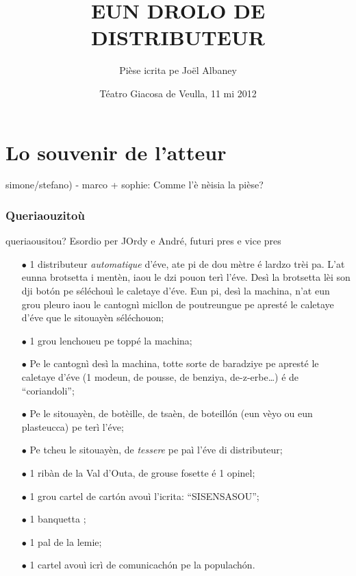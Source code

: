 \title{EUN DROLO DE DISTRIBUTEUR}
\author{Pièse icrita pe Joël Albaney}
\date{Téatro Giacosa de Veulla, 11 mi 2012}

\maketitle



\chapter*{Lo souvenir de l'atteur}
simone/stefano) - marco + sophie: Comme l'è nèisia la pièse? 

\subsection*{Queriaouzitoù}
queriaousitou? Esordio per JOrdy e André, futuri pres e vice pres

\Scenographie
\begin{itemize}
\item[$\bullet$] 1 distributeur \textit{automatique} d'éve, ate pi de dou mètre é lardzo trèi pa. L'at eunna brotsetta i mentèn, iaou le dzi pouon terì l'éve. Desì la brotsetta lèi son dji bot\'on pe séléchouì le caletaye d'éve. Eun pi, desì la machina, n'at eun grou pleuro iaou le cantognì micllon de poutreungue pe apresté le caletaye d'éve que le sitouayèn séléchouon;
\item[$\bullet$] 1 grou lenchoueu pe toppé la machina;
\item[$\bullet$] Pe le cantognì desì la machina, totte sorte de baradziye pe apresté le caletaye d'éve (1 modeun, de pousse, de benziya, de-z-erbe\ldots ) é de ``coriandoli'';
\item[$\bullet$] Pe le sitouayèn, de botèille, de tsaèn, de boteill\'on (eun vèyo ou eun plasteucca) pe terì l'éve;
\item[$\bullet$] Pe tcheu le sitouayèn, de \textit{tessere} pe paì l'éve di distributeur;
\item[$\bullet$] 1 ribàn de la Val d'Outa, de grouse fosette é 1 opinel;
\item[$\bullet$] 1 grou cartel de cart\'on avouì l'icrita: ``SISENSASOU'';
\item[$\bullet$] 1 banquetta \panchina ;
\item[$\bullet$] 1 pal de la lemie;
\item[$\bullet$] 1 cartel avouì icrì de comunicach\'on pe la populach\'on.
\end{itemize}

